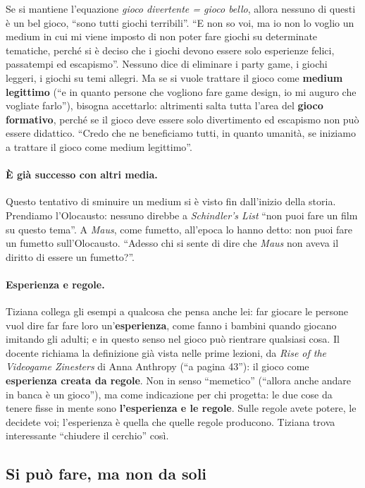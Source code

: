 Se si mantiene l'equazione \emph{gioco divertente = gioco bello}, allora nessuno di
questi è un bel gioco, ``sono tutti giochi terribili''. ``E non so voi, ma io non lo
voglio un medium in cui mi viene imposto di non poter fare giochi su determinate
tematiche, perché si è deciso che i giochi devono essere solo esperienze felici,
passatempi ed escapismo''. Nessuno dice di eliminare i party game, i giochi
leggeri, i giochi su temi allegri. Ma se si vuole trattare il gioco come
\textbf{medium legittimo} (``e in quanto persone che vogliono fare game design, io
mi auguro che vogliate farlo''), bisogna accettarlo: altrimenti salta tutta l'area
del \textbf{gioco formativo}, perché se il gioco deve essere solo divertimento ed
escapismo non può essere didattico. ``Credo che ne beneficiamo tutti, in quanto
umanità, se iniziamo a trattare il gioco come medium legittimo''.

\paragraph{È già successo con altri media.} Questo tentativo di sminuire un
medium si è visto fin dall'inizio della storia. Prendiamo l'Olocausto: nessuno
direbbe a \emph{Schindler's List} ``non puoi fare un film su questo tema''. A
\emph{Maus}, come fumetto, all'epoca lo hanno detto: non puoi fare un fumetto
sull'Olocausto. ``Adesso chi si sente di dire che \emph{Maus} non aveva il diritto
di essere un fumetto?''.

\paragraph{Esperienza e regole.} Tiziana collega gli esempi a qualcosa che pensa
anche lei: far giocare le persone vuol dire far fare loro un'\textbf{esperienza}, come
fanno i bambini quando giocano imitando gli adulti; e in questo senso nel gioco può
rientrare qualsiasi cosa. Il docente richiama la definizione già vista nelle prime
lezioni, da \emph{Rise of the Videogame Zinesters} di Anna Anthropy (``a pagina
43''): il gioco come \textbf{esperienza creata da regole}. Non in senso
``memetico'' (``allora anche andare in banca è un gioco''), ma come indicazione per
chi progetta: le due cose da tenere fisse in mente sono \textbf{l'esperienza e le
regole}. Sulle regole avete potere, le decidete voi; l'esperienza è quella che
quelle regole producono. Tiziana trova interessante ``chiudere il cerchio'' così.

\subsection{Si può fare, ma non da soli}

